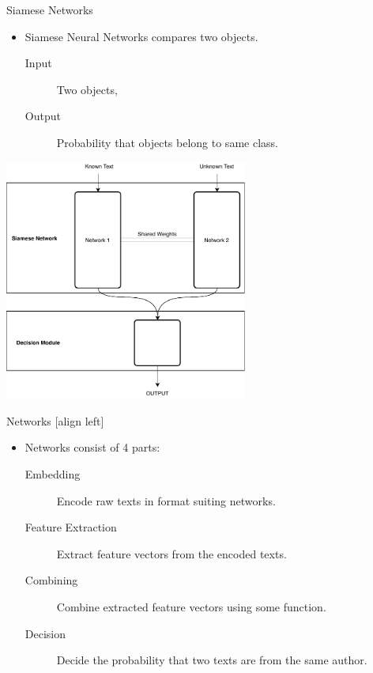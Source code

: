 \documentclass[10pt]{beamer}
\begin{document}
\begin{frame}[fragile]{Siamese Networks}
    \begin{itemize}
        \item Siamese Neural Networks compares two objects.

            \begin{description}
                \item[Input] Two objects,
                \item[Output] Probability that objects belong to same class.
            \end{description}
    \end{itemize}

    \begin{center}
        \includegraphics[width=0.6\textwidth]{../../report/pictures/method/siamese}
    \end{center}
\end{frame}

\begin{frame}[fragile]{Networks}
    [align left]
    \begin{itemize}
        \item Networks consist of 4 parts:

            \begin{description}
                \item[Embedding] Encode raw texts in format suiting networks.
                \item[Feature Extraction] Extract feature vectors from the
                    encoded texts.
                \item[Combining] Combine extracted feature vectors using some
                    function.
                \item[Decision] Decide the probability that two texts are from
                    the same author.
            \end{description}
    \end{itemize}
\end{frame}
\end{document}
